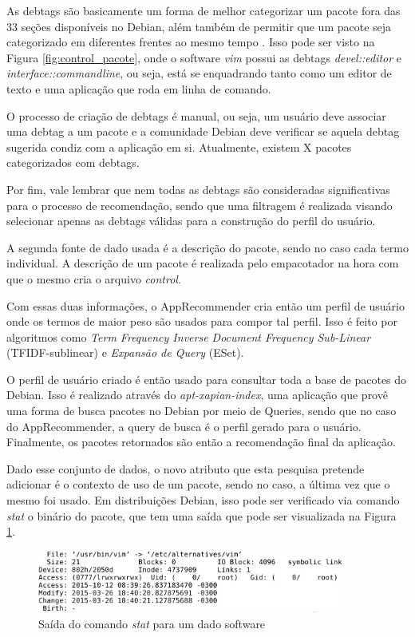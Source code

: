 As debtags são basicamente um forma de melhor categorizar um pacote fora das 33
seções disponíveis no Debian, além também de permitir que um pacote seja
categorizado em diferentes frentes ao mesmo tempo \cite{zini2005cute}. Isso pode ser visto na Figura
\ref{fig:control_pacote}, onde o software \textit{vim} possui as debtags
\textit{devel::editor} e \textit{interface::commandline}, ou seja, está se
enquadrando tanto como um editor de texto e uma aplicação que roda em linha de
comando.

O processo de criação de debtags é manual, ou seja, um usuário deve associar uma
debtag a um pacote e a comunidade Debian deve verificar se aquela debtag
sugerida condiz com a aplicação em si. Atualmente, existem X pacotes
categorizados com debtags.

Por fim, vale lembrar que nem todas as debtags são consideradas significativas
para o processo de recomendação, sendo que uma filtragem é realizada visando
selecionar apenas as debtags válidas para a construção do perfil do usuário.

A segunda fonte de dado usada é a descrição do pacote, sendo no caso cada termo
individual. A descrição de um pacote é realizada pelo empacotador na hora com
que o mesmo cria o arquivo \textit{control}.

Com essas duas informações, o AppRecommender cria então um perfil de usuário
onde os termos de maior peso são usados para compor tal perfil. Isso é feito por
algoritmos como \textit{Term Frequency Inverse Document Frequency Sub-Linear}
(TFIDF-sublinear) e \textit{Expansão de Query} (ESet).

O perfil de usuário criado é então usado para consultar toda a base de pacotes
do Debian. Isso é realizado através do \textit{apt-xapian-index}, uma aplicação
que provê uma forma de busca pacotes no Debian por meio de Queries, sendo que no
caso do AppRecommender, a query de busca é o perfil gerado para o usuário.
Finalmente, os pacotes retornados são então a recomendação final da aplicação.

Dado esse conjunto de dados, o novo atributo que esta pesquisa pretende
adicionar é o contexto de uso de um pacote, sendo no caso, a última vez que o
mesmo foi usado. Em distribuições Debian, isso pode ser verificado via comando
\textit{stat} o binário do pacote, que tem uma saída que pode ser visualizada na Figura
\ref{fig:comando_stat}.

\begin{figure}[h]
  \centering
  \includegraphics[width=0.9\textwidth]{figuras/comando_stat.eps}
  \caption{Saída do comando \textit{stat} para um dado software}
  \label{fig:comando_stat}
\end{figure}

